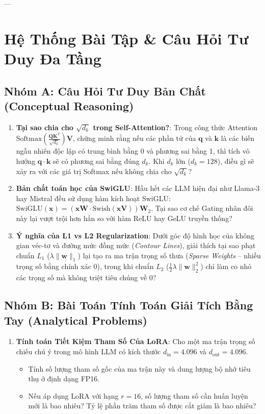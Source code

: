---

\section{Hệ Thống Bài Tập \& Câu Hỏi Tư Duy Đa Tầng}
\label{sec:ch04-exercises}

\subsection{Nhóm A: Câu Hỏi Tư Duy Bản Chất (Conceptual Reasoning)}

\begin{enumerate}[label=\textbf{A\arabic*.}]
  \item \textbf{Tại sao chia cho $\sqrt{d_k}$ trong Self-Attention?}: Trong công thức Attention $\text{Softmax}\left(\frac{\mathbf{Q}\mathbf{K}^T}{\sqrt{d_k}}\right)\mathbf{V}$, chứng minh rằng nếu các phần tử của $\mathbf{q}$ và $\mathbf{k}$ là các biến ngẫu nhiên độc lập có trung bình bằng 0 và phương sai bằng 1, thì tích vô hướng $\mathbf{q} \cdot \mathbf{k}$ sẽ có phương sai bằng đúng $d_k$. Khi $d_k$ lớn ($d_k = 128$), điều gì sẽ xảy ra với các giá trị Softmax nếu không chia cho $\sqrt{d_k}$?
  \item \textbf{Bản chất toán học của SwiGLU}: Hầu hết các LLM hiện đại như Llama-3 hay Mistral đều sử dụng hàm kích hoạt SwiGLU: $\text{SwiGLU}(\mathbf{x}) = (\mathbf{x} \mathbf{W} \cdot \text{Swish}(\mathbf{x} \mathbf{V})) \mathbf{W}_2$. Tại sao cơ chế Gating nhân đôi này lại vượt trội hơn hẳn so với hàm ReLU hay GeLU truyền thống?
  \item \textbf{Ý nghĩa của L1 vs L2 Regularization}: Dưới góc độ hình học của không gian véc-tơ và đường mức đồng mức (\textit{Contour Lines}), giải thích tại sao phạt chuẩn $L_1$ ($\lambda \|\mathbf{w}\|_1$) lại tạo ra ma trận trọng số thưa (\textit{Sparse Weights} -- nhiều trọng số bằng chính xác 0), trong khi chuẩn $L_2$ ($\frac{1}{2}\lambda \|\mathbf{w}\|_2^2$) chỉ làm co nhỏ các trọng số mà không triệt tiêu chúng về 0?
\end{enumerate}

\subsection{Nhóm B: Bài Toán Tính Toán Giải Tích Bằng Tay (Analytical Problems)}

\begin{enumerate}[label=\textbf{B\arabic*.}]
  \item \textbf{Tính toán Tiết Kiệm Tham Số Của LoRA}: Cho một ma trận trọng số chiếu chú ý trong mô hình LLM có kích thước $d_{\text{in}} = 4.096$ và $d_{\text{out}} = 4.096$.
  \begin{itemize}
    \item[a)] Tính số lượng tham số gốc của ma trận này và dung lượng bộ nhớ tiêu thụ ở định dạng FP16.
    \item[b)] Nếu áp dụng LoRA với hạng $r = 16$, số lượng tham số cần huấn luyện mới là bao nhiêu? Tỷ lệ phần trăm tham số được cắt giảm là bao nhiêu?
  \end{itemize}
\end{enumerate}

